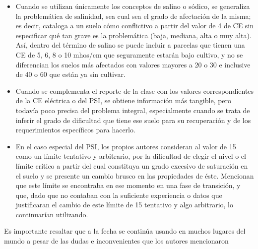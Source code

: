 \begin{itemize}
    \item Cuando se utilizan únicamente los conceptos de salino o sódico, se generaliza la problemática de salinidad, sea cual sea el grado de afectación de la misma; es decir, cataloga a un suelo cómo conflictivo a partir del valor de 4 de CE sin especificar qué tan grave es la problemática (baja, mediana, alta o muy alta). Así, dentro del término de salino se puede incluir a parcelas que tienen una CE de 5, 6, 8 o 10 mhos/cm que seguramente estarán bajo cultivo, y no se diferencian los suelos más afectados con valores mayores a 20 o 30 e inclusive de 40 o 60 que están ya sin cultivar.
    \item Cuando se complementa el reporte de la clase con los valores correspondientes de la CE eléctrica o del PSI, se obtiene información más tangible, pero todavía poco precisa del problema integral, especialmente cuando se trata de inferir el grado de dificultad que tiene ese suelo para su recuperación y de los requerimientos específicos para hacerlo.
    \item En el caso especial del PSI, los propios autores consideran al valor de 15 como un límite tentativo y arbitrario, por la dificultad de elegir el nivel o el límite crítico a partir del cual constituya un grado excesivo de saturación en el suelo y se presente un cambio brusco en las propiedades de éste. Mencionan que este límite se encontraba en ese momento en una fase de transición, y que, dado que no contaban con la suficiente experiencia o datos que justificaran el cambio de este límite de 15 tentativo y algo arbitrario, lo continuarían utilizando.
\end{itemize}
Es importante resaltar que a la fecha se continúa usando en muchos lugares del
mundo a pesar de las dudas e inconvenientes que los autores mencionaron


